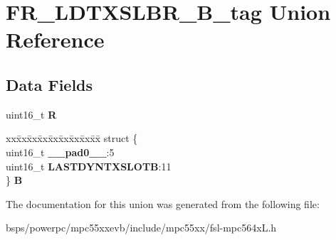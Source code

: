 \hypertarget{unionFR__LDTXSLBR__16B__tag}{}\section{F\+R\+\_\+\+L\+D\+T\+X\+S\+L\+B\+R\+\_\+B\+\_\+tag Union Reference}
\label{unionFR__LDTXSLBR__16B__tag}
\subsection*{Data Fields}
\begin{DoxyCompactItemize}
\item 
\mbox{\label{unionFR__LDTXSLBR__16B__tag_acc81a1e4503d5da7c7bb149635162521}} 
uint16\+\_\+t {\bfseries R}
\item 
\mbox{\label{unionFR__LDTXSLBR__16B__tag_ac0099ec64acd9e673e4d916a6e314f35}} 
\begin{tabbing}
xx\=xx\=xx\=xx\=xx\=xx\=xx\=xx\=xx\=\kill
struct \{\\
\>uint16\_t {\bfseries \_\_pad0\_\_}:5\\
\>uint16\_t {\bfseries LASTDYNTXSLOTB}:11\\
\} {\bfseries B}\\

\end{tabbing}\end{DoxyCompactItemize}


The documentation for this union was generated from the following file\+:\begin{DoxyCompactItemize}
\item 
bsps/powerpc/mpc55xxevb/include/mpc55xx/fsl-\/mpc564x\+L.\+h\end{DoxyCompactItemize}
